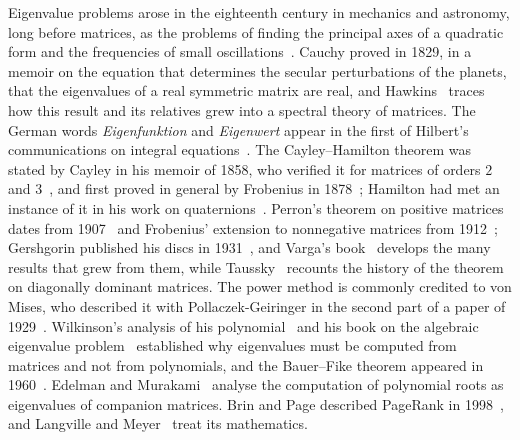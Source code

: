 Eigenvalue problems arose in the eighteenth century in mechanics and astronomy, long before matrices, as the problems of finding the principal axes of a quadratic form and the frequencies of small oscillations~\cite{hawkins1975cauchy}. Cauchy proved in 1829, in a memoir on the equation that determines the secular perturbations of the planets, that the eigenvalues of a real symmetric matrix are real, and Hawkins~\cite{hawkins1975cauchy} traces how this result and its relatives grew into a spectral theory of matrices. The German words \emph{Eigenfunktion} and \emph{Eigenwert} appear in the first of Hilbert's communications on integral equations~\cite{hilbert1904}. The Cayley--Hamilton theorem was stated by Cayley in his memoir of 1858, who verified it for matrices of orders $2$ and $3$~\cite{cayley1858}, and first proved in general by Frobenius in 1878~\cite{frobenius1878}; Hamilton had met an instance of it in his work on quaternions~\cite{hamilton1853}. Perron's theorem on positive matrices dates from 1907~\cite{perron1907} and Frobenius' extension to nonnegative matrices from 1912~\cite{frobenius1912}; Gershgorin published his discs in 1931~\cite{gershgorin1931}, and Varga's book~\cite{varga2004} develops the many results that grew from them, while Taussky~\cite{taussky1949} recounts the history of the theorem on diagonally dominant matrices. The power method is commonly credited to von Mises, who described it with Pollaczek-Geiringer in the second part of a paper of 1929~\cite{vonmises1929}. Wilkinson's analysis of his polynomial~\cite{wilkinson1959} and his book on the algebraic eigenvalue problem~\cite{wilkinson1965} established why eigenvalues must be computed from matrices and not from polynomials, and the Bauer--Fike theorem appeared in 1960~\cite{bauerfike1960}. Edelman and Murakami~\cite{edelman1995} analyse the computation of polynomial roots as eigenvalues of companion matrices. Brin and Page described PageRank in 1998~\cite{brin1998}, and Langville and Meyer~\cite{langville2006} treat its mathematics.

